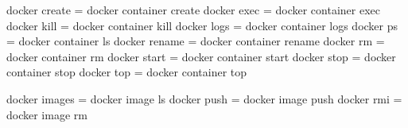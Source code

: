 \begin{bashcode}
docker create = docker container create  
docker exec   = docker container exec    
docker kill   = docker container kill    
docker logs   = docker container logs    
docker ps     = docker container ls      
docker rename = docker container rename
docker rm     = docker container rm      
docker start  = docker container start   
docker stop   = docker container stop    
docker top    = docker container top     

docker images = docker image     ls      
docker push   = docker image     push    
docker rmi    = docker image     rm    
\end{bashcode}